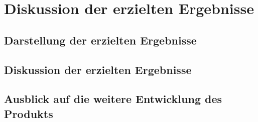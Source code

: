 %
\section{Diskussion der erzielten Ergebnisse}

\subsection{Darstellung der erzielten Ergebnisse}
\subsection{Diskussion der erzielten Ergebnisse}
\subsection{Ausblick auf die weitere Entwicklung des Produkts}